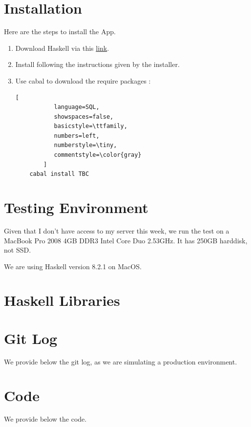 \documentclass[12pt,a4paper,article]{memoir} %
\begin{document}
\newpage
\appendix
{}
\chapter{Installation} \label{apx:installation}

Here are the steps to install the App.
\begin{enumerate}
	\item Download Haskell via this \href{https://www.haskell.org/platform/}{link}.
	\item Install following the instructions given by the installer.
	\item Use cabal to download the require packages :
\begin{lstlisting}[
           language=SQL,
           showspaces=false,
           basicstyle=\ttfamily,
           numbers=left,
           numberstyle=\tiny,
           commentstyle=\color{gray}
        ]
	cabal install TBC
\end{lstlisting}
\end{enumerate}

\newpage
\chapter{Testing Environment} \label{apx:testing.env}

Given that I don't have access to my server this week, 
we run the test on a MacBook Pro 2008 4GB DDR3 Intel Core Duo 2.53GHz.
It has 250GB harddisk, not SSD. 

We are using Haskell version 8.2.1 on MacOS.

\newpage
\chapter{Haskell Libraries} \label{apx:haskell.libraries}

\newpage
\chapter{Git Log} \label{apx:git.log}
We provide below the git log, as we are simulating a production environment.

\newpage
\chapter{Code} \label{apx:code}
We provide below the code.
\end{document}
